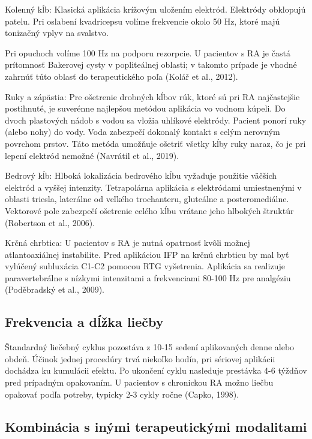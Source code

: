Kolenný kĺb: Klasická aplikácia krížovým uložením elektród. Elektródy obklopujú patelu. Pri oslabení kvadricepsu volíme frekvencie okolo 50 Hz, ktoré majú tonizačný vplyv na svalstvo. 

Pri opuchoch volíme 100 Hz na podporu rezorpcie. U pacientov s RA je častá prítomnosť Bakerovej cysty v popliteálnej oblasti; v takomto prípade je vhodné zahrnúť túto oblasť do terapeutického poľa (Kolář et al., 2012). 

Ruky a zápästia: Pre ošetrenie drobných kĺbov rúk, ktoré sú pri RA najčastejšie postihnuté, je suverénne najlepšou metódou aplikácia vo vodnom kúpeli. Do dvoch plastových nádob s vodou sa vložia uhlíkové elektródy. Pacient ponorí ruky (alebo nohy) do vody. Voda zabezpečí dokonalý kontakt s celým nerovným povrchom prstov. Táto metóda umožňuje ošetriť všetky kĺby ruky naraz, čo je pri lepení elektród nemožné (Navrátil et al., 2019). 

Bedrový kĺb: Hlboká lokalizácia bedrového kĺbu vyžaduje použitie väčších elektród a vyššej intenzity. Tetrapolárna aplikácia s elektródami umiestnenými v oblasti triesla, laterálne od veľkého trochanteru, gluteálne a posteromediálne. Vektorové pole zabezpečí ošetrenie celého kĺbu vrátane jeho hlbokých štruktúr (Robertson et al., 2006). 

Krčná chrbtica: U pacientov s RA je nutná opatrnosť kvôli možnej atlantoaxiálnej instabilite. Pred aplikáciou IFP na krčnú chrbticu by mal byť vylúčený subluxácia C1-C2 pomocou RTG vyšetrenia. Aplikácia sa realizuje paravertebrálne s nízkymi intenzitami a frekvenciami 80-100 Hz pre analgéziu (Poděbradský et al., 2009). 

\subsection{Frekvencia a dĺžka liečby}

Štandardný liečebný cyklus pozostáva z 10-15 sedení aplikovaných denne alebo obdeň. Účinok jednej procedúry trvá niekoľko hodín, pri sériovej aplikácii dochádza ku kumulácii efektu. Po ukončení cyklu nasleduje prestávka 4-6 týždňov pred prípadným opakovaním. U pacientov s chronickou RA možno liečbu opakovať podľa potreby, typicky 2-3 cykly ročne (Capko, 1998). 

\subsection{Kombinácia s inými terapeutickými modalitami}

